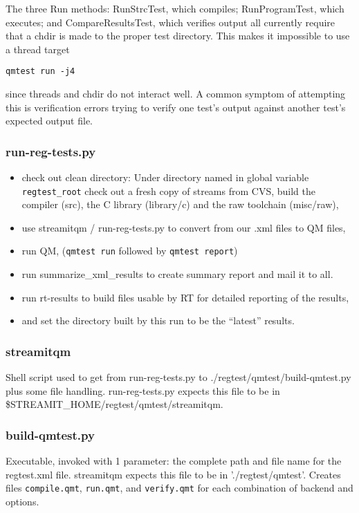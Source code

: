 \documentclass[11pt]{article}
\begin{document}
The three Run methods: RunStrcTest, which compiles; RunProgramTest,
which executes; and CompareResultsTest, which verifies output
all currently require that a chdir is made to the proper test
directory.
This makes it impossible to use a thread target
\begin{verbatim}
qmtest run -j4
\end{verbatim}
since threads and chdir do not interact well.
A common symptom of attempting this is verification errors trying to
verify one test's output against another test's expected output file.

\subsubsection{run-reg-tests.py}
\begin{itemize}
\item check out clean directory:
 Under directory named in global variable {\tt regtest\_root} check
 out a fresh copy of streams from CVS, build the compiler (src), the C
 library (library/c) and the raw toolchain (misc/raw),
\item use streamitqm / run-reg-tests.py to convert from our .xml files to QM
  files,
\item run QM,  ({\tt qmtest run} followed by  {\tt qmtest report})
\item run summarize_xml_results to create summary report and mail it to all.
\item run rt-results to build files usable by RT for detailed
  reporting of the results,
\item and set the directory built by this run to be the ``latest'' results.
\end{itemize}

\subsubsection{streamitqm}
Shell script used to get from run-reg-tests.py to 
./regtest/qmtest/build-qmtest.py
plus some file handling.  run-reg-tests.py expects this file to be in 
\$STREAMIT\_HOME/regtest/qmtest/streamitqm.

\subsubsection{build-qmtest.py}
Executable, invoked with 1 parameter: the complete path and file name for the 
regtest.xml file.  streamitqm expects this file to be in './regtest/qmtest'.
Creates files {\tt compile.qmt}, {\tt run.qmt}, and {\tt verify.qmt}
for each combination of backend and options.
\end{document}
